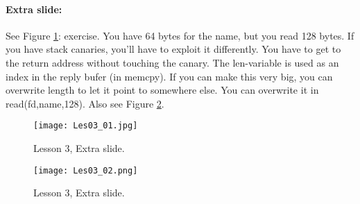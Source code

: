 \documentclass[10pt,a4paper]{report}
\begin{document}
\paragraph{Extra slide:} See Figure \ref{les03_01}: exercise. You have 64 bytes for the name, but you read 128 bytes. If you have stack canaries, you'll have to exploit it differently. You have to get to the return address without touching the canary. The len-variable is used as an index in the reply bufer (in memcpy). If you can make this very big, you can overwrite length to let it point to somewhere else. You can overwrite it in read(fd,name,128). Also see Figure \ref{les03_02}. 

\begin{figure}[ht!]
\centering
\texttt{[image: Les03\_01.jpg]}
\caption{Lesson 3, Extra slide.} 
\label{les03_01}
\end{figure}

\begin{figure}[ht!]
\centering
\texttt{[image: Les03\_02.png]}
\caption{Lesson 3, Extra slide.} 
\label{les03_02}
\end{figure}
\end{document}

